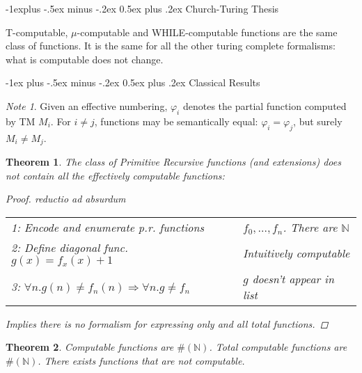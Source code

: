 \documentclass[10pt,landscape]{article}
\makeatletter
\newcommand{\impl}{\Rightarrow}
\newcommand{\N}{\mathbb{N}}
\theoremstyle{plain}%
\newtheorem*{thm}{Theorem}
\theoremstyle{definition}
\theoremstyle{remark}
\newtheorem*{note}{Note}
\renewcommand{\section}{\@startsection{section}{1}{0mm}%
                                {-1ex plus -.5ex minus -.2ex}%
                                {0.5ex plus .2ex}%
                                {\normalfont\large\bfseries}}
\renewcommand{\subsection}{\@startsection{subsection}{2}{0mm}%
                                {-1explus -.5ex minus -.2ex}%
                                {0.5ex plus .2ex}%
                                {\normalfont\normalsize\bfseries}}
\makeatother
\begin{document}
\begin{multicols}{4}
\subsection{Church-Turing Thesis}

\begin{center}
\end{center}

T-computable, $\mu$-computable and WHILE-computable functions are the same class
of functions. It is the same for all the other turing complete formalisms: what
is computable does not change.


\section{Classical Results}


\begin{note}
    Given an effective numbering, $\varphi_i$ denotes the partial function computed
    by TM $M_i$. For $i \neq j$, functions may be semantically equal: $\varphi_i = \varphi_j$,
    but surely $M_i \neq M_j$.
\end{note}

\begin{thm}
    The class of Primitive Recursive functions (and extensions) does not contain all the effectively computable functions:
    \begin{proof}
        reductio ad absurdum
        \begin{tabular}{@{}ll@{}}
            1: Encode and enumerate p.r. functions & $f_0, \hdots, f_n $. There are $\N$ \\ 
            2: Define diagonal func. $g(x) = f_x(x)+1$ & Intuitively computable \\
            3: $\forall n . g(n) \neq f_n(n) \impl \forall n . g \neq f_n $ & $g$ doesn't appear in list \\ 
          
        \end{tabular}
        Implies there is no formalism for expressing only and all total functions. 
    \end{proof}
\end{thm}


\begin{thm}
    Computable functions are $\#(\N)$. Total computable functions are $\#(\N)$. There exists 
    functions that are not computable.


\end{thm}
\end{multicols}
\end{document}
